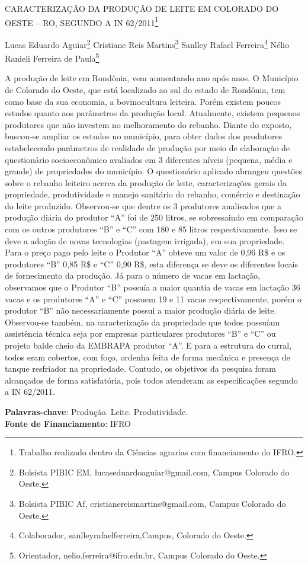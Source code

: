 \documentclass[article,12pt,onesidea,4paper,english,brazil]{abntex2}
\begin{document}
	
	
	\frenchspacing 
	
	\begin{center}
		\LARGE CARACTERIZAÇÃO DA PRODUÇÃO DE LEITE EM COLORADO DO OESTE – RO, SEGUNDO A IN 62/2011\footnote{Trabalho realizado dentro da Ciências agrarias com financiamento do IFRO.}
		
		\normalsize
	Lucas Eduardo Aguiar\footnote{Bolsista PIBIC EM, lucaseduardoaguiar@gmail.com, Campus Colorado do Oeste.} 
	Cristiane Reis Martins\footnote{Bolsista PIBIC Af, cristianereismartins@gmail.com, Campus Colorado do Oeste.} 
		Sanlley Rafael Ferreira\footnote{Colaborador, sanlleyrafaelferreira,Campus, Colorado do Oeste.} 
		Nélio Ranieli Ferreira de Paula\footnote{Orientador, nelio.ferreira@ifro.edu.br, Campus Colorado do Oeste.} 
	\end{center}
	
	\noindent A produção de leite em Rondônia, vem aumentando ano após anos. O Município de Colorado do Oeste, que está localizado ao sul do estado de Rondônia, tem como base da sua economia, a bovinocultura leiteira. Porém existem poucos estudos quanto aos parâmetros da produção local. Atualmente, existem pequenos produtores que não investem no melhoramento do rebanho. Diante do exposto, buscou-se ampliar os estudos no município, para obter dados dos produtores estabelecendo parâmetros de realidade de produção por meio de elaboração de questionário socioeconômico avaliados em 3 diferentes níveis (pequena, média e grande) de propriedades do município. O questionário aplicado abrangeu questões sobre o rebanho leiteiro acerca da produção de leite, caracterizações gerais da propriedade, produtividade e manejo sanitário do rebanho, comércio e destinação do leite produzido. Observou-se que dentre os 3 produtores analisados que a produção diária do produtor “A” foi de 250 litros, se sobressaindo em comparação com os outros produtores “B” e “C” com 180 e 85 litros respectivamente. Isso se deve a adoção de novas tecnologias (pastagem irrigada), em sua propriedade. Para o preço pago pelo leite o Produtor “A” obteve um valor de 0,96 R\$ e os produtores “B” 0,85 R\$ e “C” 0,90 R\$, esta diferença se deve os diferentes locais de fornecimento da produção. Já para o número de vacas em lactação, observamos que o Produtor “B” possuía a maior quantia de vacas em lactação 36 vacas e os produtores “A” e “C” possuem 19 e 11 vacas respectivamente, porém o produtor “B” não necessariamente possui a maior produção diária de leite. Observou-se também, na caracterização da propriedade que todos possuíam assistência técnica seja por empresas particulares produtores “B” e “C” ou projeto balde cheio da EMBRAPA produtor “A”. E para a estrutura do curral, todos eram cobertos, com foço, ordenha feita de forma mecânica e presença de tanque resfriador na propriedade. Contudo, os objetivos da pesquisa foram alcançados de forma satisfatória, pois todos atenderam as especificações segundo a IN 62/2011.
	
	\vspace{\onelineskip}
	
	\noindent
	\textbf{Palavras-chave}: Produção. Leite. Produtividade. \\
	\textbf{Fonte de Financiamento}: IFRO
	
\end{document}
